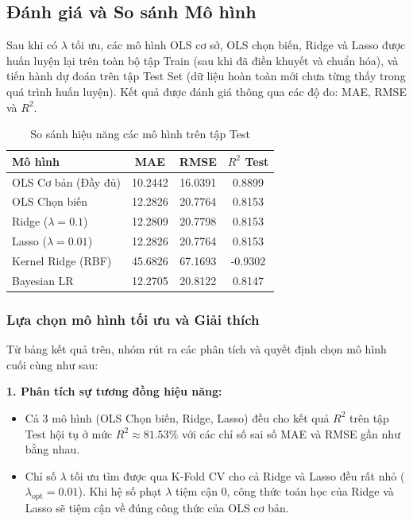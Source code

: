 \subsection{Đánh giá và So sánh Mô hình}

Sau khi có $\lambda$ tối ưu, các mô hình OLS cơ sở, OLS chọn biến, Ridge và Lasso được huấn luyện lại trên toàn bộ tập Train (sau khi đã điền khuyết và chuẩn hóa), và tiến hành dự đoán trên tập Test Set (dữ liệu hoàn toàn mới chưa từng thấy trong quá trình huấn luyện). Kết quả được đánh giá thông qua các độ đo: MAE, RMSE và $R^2$.

\begin{table}[h]
    \centering
    \begin{tabular}{|l|c|c|c|}
        \hline
        \textbf{Mô hình} & \textbf{MAE} & \textbf{RMSE} & \textbf{$R^2$ Test} \\
        \hline
        OLS Cơ bản (Đầy đủ) & 10.2442 & 16.0391 & 0.8899 \\
        OLS Chọn biến & 12.2826 & 20.7764 & 0.8153 \\
        Ridge ($\lambda = 0.1$) & 12.2809 & 20.7798 & 0.8153 \\
        Lasso ($\lambda = 0.01$) & 12.2826 & 20.7764 & 0.8153 \\
        Kernel Ridge (RBF) & 45.6826 & 67.1693 & -0.9302 \\
        Bayesian LR & 12.2705 & 20.8122 & 0.8147 \\
        \hline
    \end{tabular}
    \caption{So sánh hiệu năng các mô hình trên tập Test}
    \label{tab:model_comparison}
\end{table}

\subsubsection{Lựa chọn mô hình tối ưu và Giải thích}

Từ bảng kết quả trên, nhóm rút ra các phân tích và quyết định chọn mô hình cuối cùng như sau:

\textbf{1. Phân tích sự tương đồng hiệu năng:}
\begin{itemize}
    \item Cả 3 mô hình (OLS Chọn biến, Ridge, Lasso) đều cho kết quả $R^2$ trên tập Test hội tụ ở mức $R^2 \approx 81.53\%$ với các chỉ số sai số MAE và RMSE gần như bằng nhau.
    \item Chỉ số $\lambda$ tối ưu tìm được qua K-Fold CV cho cả Ridge và Lasso đều rất nhỏ ($\lambda_{\text{opt}} = 0.01$). Khi hệ số phạt $\lambda$ tiệm cận $0$, công thức toán học của Ridge và Lasso sẽ tiệm cận về đúng công thức của OLS cơ bản.
\end{itemize}

